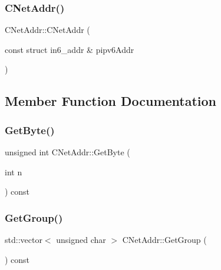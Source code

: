 \mbox{\label{class_c_net_addr_a9eae4232457f7659a157467274d1b444}} 
\subsubsection{\texorpdfstring{C\+Net\+Addr()}{CNetAddr()}\hspace{0.1cm}{\footnotesize\ttfamily [5/5]}}
{\footnotesize\ttfamily C\+Net\+Addr\+::\+C\+Net\+Addr (\begin{DoxyParamCaption}\item[{const struct in6\+\_\+addr \&}]{pipv6\+Addr }\end{DoxyParamCaption})}



\subsection{Member Function Documentation}
\mbox{\label{class_c_net_addr_acfd51ebf2030b01fa5ac133176512475}} 
\subsubsection{\texorpdfstring{Get\+Byte()}{GetByte()}}
{\footnotesize\ttfamily unsigned int C\+Net\+Addr\+::\+Get\+Byte (\begin{DoxyParamCaption}\item[{int}]{n }\end{DoxyParamCaption}) const}

\mbox{\label{class_c_net_addr_a6f8211515f809f6972ce327433d41458}} 
\subsubsection{\texorpdfstring{Get\+Group()}{GetGroup()}}
{\footnotesize\ttfamily std\+::vector$<$ unsigned char $>$ C\+Net\+Addr\+::\+Get\+Group (\begin{DoxyParamCaption}{ }\end{DoxyParamCaption}) const}

